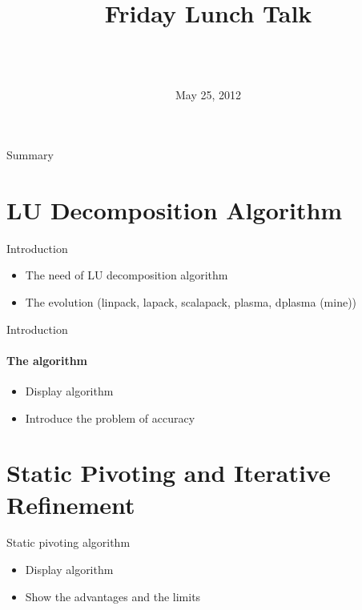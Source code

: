 \documentclass{beamer}
\title[LU decomposition on DAGuE]{
        {\bfseries \projet\\} 
        {\bfseries \huge \sujet}
        {\small Friday Lunch Talk}
}
\date{May 25, 2012}
\author[Zenati]{
  {\normalsize \bfseries \sffamily} {\large \gA}\\
  \vspace{1cm}
  {\normalsize \bfseries \sffamily} {\large \gB}\\
}
\begin{document}
        
\begin{frame}
\maketitle
\end{frame}

\begin{frame}{Summary}
\tableofcontents
\end{frame}



\section{LU Decomposition Algorithm}
\begin{frame}{Introduction}
\begin{itemize}
\item The need of LU decomposition algorithm
\item The evolution (linpack, lapack, scalapack, plasma, dplasma (mine))
\end{itemize}
\end{frame}

\begin{frame}{Introduction}
\framesubtitle{The algorithm}
\begin{itemize}
\item Display algorithm
\item Introduce the problem of accuracy
\end{itemize}
\end{frame}

\section{Static Pivoting and Iterative Refinement}

\begin{frame}{Static pivoting algorithm}
\begin{itemize}
\item Display algorithm
\item Show the advantages and the limits
\end{itemize}
\end{frame}
\end{document}
